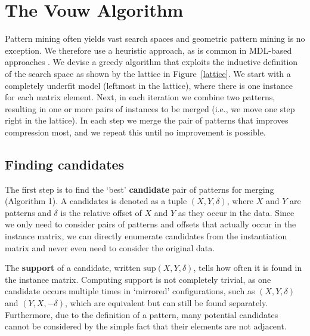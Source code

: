 \documentclass{llncs}
\begin{document}
\section{The Vouw Algorithm}

Pattern mining often yields vast search spaces and geometric pattern mining is no exception. We therefore use a heuristic approach, as is common in MDL-based approaches \cite{krimp,slim,classy}. We devise a greedy algorithm that exploits the inductive definition of the search space as shown by the lattice in Figure~\ref{lattice}. We start with a completely underfit model (leftmost in the lattice), where there is one instance for each matrix element. Next, in each iteration we combine two patterns, resulting in one or more pairs of instances to be merged (i.e., we move one step right in the lattice). In each step we merge the pair of patterns that improves compression most, and we repeat this until no improvement is possible.


\subsection{Finding candidates}

The first step is to find the `best' \textbf{candidate} pair of patterns for merging (Algorithm 1). A candidates is denoted as a tuple $(X,Y,\delta)$, where $X$ and $Y$ are patterns and $\delta$ is the relative offset of $X$ and $Y$ as they occur in the data.
Since we only need to consider pairs of patterns and offsets that actually occur in the instance matrix, we can directly enumerate candidates from the instantiation matrix and never even need to consider the original data.  

The \textbf{support} of a candidate, written $\mathrm{sup}(X,Y,\delta)$, tells how often it is found in the instance matrix. Computing support is not completely trivial, as one candidate occurs multiple times in `mirrored' configurations, such as $(X,Y,\delta)$ and $(Y,X,-\delta)$, which are equivalent but can still be found separately. Furthermore, due to the definition of a pattern, many potential candidates cannot be considered by the simple fact that their elements are not adjacent. 
\end{document}

